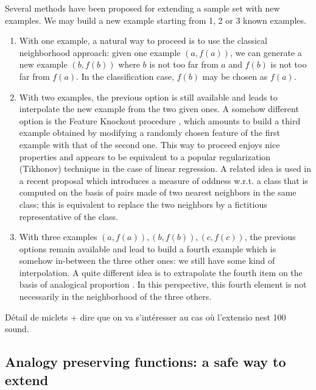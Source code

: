 Several methods have been proposed for extending a sample set with new
examples. We may build a new example starting from 1, 2 or 3 known examples.
\begin{enumerate}
\item With one example, a natural way to proceed is to use the classical
  neighborhood approach: given one  example $(a,f(a))$, we can generate a new
    example $(b,f(b))$ where  $b$ is not too far from $a$ and $f(b)$ is not too
    far from $f(a)$. In the classification case, $f(b)$ may be chosen as
    $f(a)$.
\item With two examples, the previous option is still available and leads to
  interpolate the new example from the two given ones.  A somehow different
    option is the Feature Knockout procedure \cite{WolMar04}, which amounts
    to build a third example obtained by modifying a randomly chosen feature
    of the first example with that of the second one.  This way to
    proceed enjoys nice properties and appears to be equivalent to a popular
    regularization (Tikhonov) technique in the case of linear regression.  A
    related idea is used in a recent proposal \cite{BouPraRicECAI16} which
    introduces a measure of oddness w.r.t. a class that is computed on the
    basis of pairs made of two nearest neighbors in the same class; this is
    equivalent to replace the two neighbors by a fictitious representative of
    the class.

\item With three examples $(a,f(a)), (b,f(b)), (c,f(c))$, the previous options
  remain available and lead to build a fourth example which is somehow
    in-between the three other ones: we still have some kind of interpolation.
    A quite different idea is to extrapolate the fourth item on the basis of
    analogical proportion \cite{BayMouMicAnqECML07}.  In this perspective,
    this fourth element is not necessarily in the neighborhood of the three
    others.
\end{enumerate}

Détail de miclets + dire que on va s'intéresser au cas où l'extensio nest 100%
sound.

\subsection {Analogy preserving functions: a safe way to extend}

